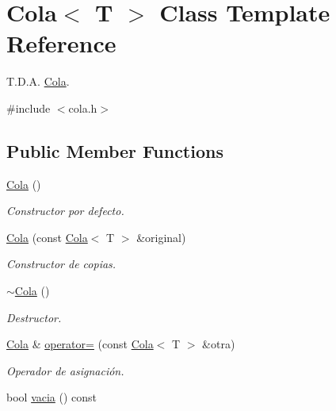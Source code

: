 \hypertarget{classCola}{}\section{Cola$<$ T $>$ Class Template Reference}
\label{classCola}


T.\+D.\+A. \hyperlink{classCola}{Cola}.  




{\ttfamily \#include $<$cola.\+h$>$}

\subsection*{Public Member Functions}
\begin{DoxyCompactItemize}
\item 
\mbox{\label{classCola_aea3a971c7c522618f4dc972e8b4ff153}} 
\hyperlink{classCola_aea3a971c7c522618f4dc972e8b4ff153}{Cola} ()
\begin{DoxyCompactList}\small\item\em Constructor por defecto. \end{DoxyCompactList}\item 
\hyperlink{classCola_a2249ab5603a92fddb8bd9bb55abeaa24}{Cola} (const \hyperlink{classCola}{Cola}$<$ T $>$ \&original)
\begin{DoxyCompactList}\small\item\em Constructor de copias. \end{DoxyCompactList}\item 
\mbox{\label{classCola_af4d55930921c93c626006ba2e842530b}} 
\hyperlink{classCola_af4d55930921c93c626006ba2e842530b}{$\sim$\+Cola} ()
\begin{DoxyCompactList}\small\item\em Destructor. \end{DoxyCompactList}\item 
\hyperlink{classCola}{Cola} \& \hyperlink{classCola_a2ac480681dec95b8ffeea075507849e2}{operator=} (const \hyperlink{classCola}{Cola}$<$ T $>$ \&otra)
\begin{DoxyCompactList}\small\item\em Operador de asignación. \end{DoxyCompactList}\item 
\mbox{\label{classCola_a2c746a66289cd4f90d4e43f712b72fb6}} 
bool \hyperlink{classCola_a2c746a66289cd4f90d4e43f712b72fb6}{vacia} () const

\end{DoxyCompactItemize}
